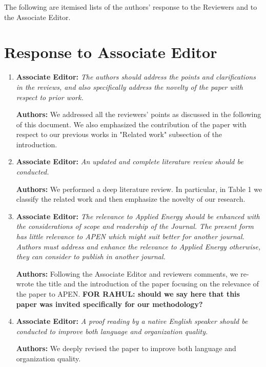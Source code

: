 \documentclass{article}
\begin{document}
The following are itemised lists of the authors' response to the Reviewers and to the Associate Editor.



\section{Response to Associate Editor}



\begin{enumerate}

	\item \textbf{Associate Editor:} \textit{The authors should address the points and clarifications in the reviews, and also specifically address the novelty of the paper with respect to prior work.}
	
	\textbf{Authors:} We addressed all the reviewers' points as discussed in the following of this document. We also emphasized the contribution of the paper with respect to our previous works in "Related work" subsection of the introduction.
	
	\item \textbf{Associate Editor:} \textit{An updated and complete literature review should be conducted.}
		
	\textbf{Authors:} We performed a deep literature review. In particular, in Table 1 we classify the related work and then emphasize the novelty of our research.

	\item \textbf{Associate Editor:} \textit{The relevance to Applied Energy should be enhanced with the considerations of scope and readership of the Journal.  The present form has little relevance to APEN which might suit better for another journal. Authors must address and enhance the relevance to Applied Energy otherwise, they can consider to publish in another journal.}
	
	\textbf{Authors:} Following the Associate Editor and reviewers comments, we re-wrote the title and the introduction of the paper focusing on the relevance of the paper to APEN. \textbf{FOR RAHUL: should we say here that this paper was invited specifically for our methodology?}

	\item \textbf{Associate Editor:} \textit{A proof reading by a native English speaker should be conducted to improve both language and organization quality. }

	\textbf{Authors:} We deeply revised the paper to improve both language and organization quality.


\end{enumerate}
\end{document}
